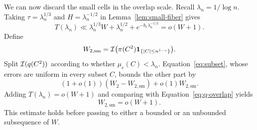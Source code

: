 We can now discard the small cells in the overlap scale.  Recall
$\lambda_n=1/\log n$.  Taking
$\tau=\lambda_n^{1/3}$ and $H=\lambda_n^{-1/2}$ in
Lemma~\ref{lem:small-fiber} gives
\[
 T(\lambda_n)
 \ll\lambda_n^{1/3}W+\lambda_n^{1/2}
       +e^{-b_1\lambda_n^{-1/2}}
 =o(W+1).
\]
Define
\[
 W_{2,\mathrm{sm}}=
 \mathcal I\bigl(\pi(C^2)\mathbf 1_{\{|C|\le n^{1-c}\}}\bigr).
\]
Split $\mathcal I(q(C^2))$ according to whether
$\mu_e(C)<\lambda_n$.  Equation~\eqref{eq:subset}, whose errors are
uniform in every subset $C$, bounds the other part by
\[
 (1+o(1))(W_2-W_{2,\mathrm{sm}})+o(1)W_{2,\mathrm{sm}}.
\]
Adding $T(\lambda_n)=o(W+1)$ and comparing with
Equation~\eqref{eq:q-overlap} yields
\begin{equation}\label{eq:small-overlap}
 W_{2,\mathrm{sm}}=o(W+1).
\end{equation}
This estimate holds before passing to either a bounded or an unbounded
subsequence of $W$.
